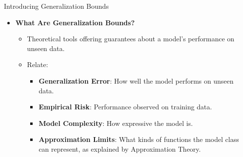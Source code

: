 \documentclass[
  ignorenonframetext,
]{beamer}
\providecommand{\tightlist}{%
  \setlength{\itemsep}{0pt}\setlength{\parskip}{0pt}}\usepackage{longtable,booktabs,array}
\begin{document}
\begin{frame}{Introducing Generalization Bounds}
\label{introducing-generalization-bounds}
\begin{itemize}
\tightlist
\item
  \textbf{What Are Generalization Bounds?}

  \begin{itemize}
  \tightlist
  \item
    Theoretical tools offering guarantees about a model's performance on
    unseen data.
  \item
    Relate:

    \begin{itemize}
    \tightlist
    \item
      \textbf{Generalization Error}: How well the model performs on
      unseen data.
    \item
      \textbf{Empirical Risk}: Performance observed on training data.
    \item
      \textbf{Model Complexity}: How expressive the model is.
    \item
      \textbf{Approximation Limits}: What kinds of functions the model
      class can represent, as explained by Approximation Theory.
    \end{itemize}
  \end{itemize}
\end{itemize}
\end{frame}
\end{document}
